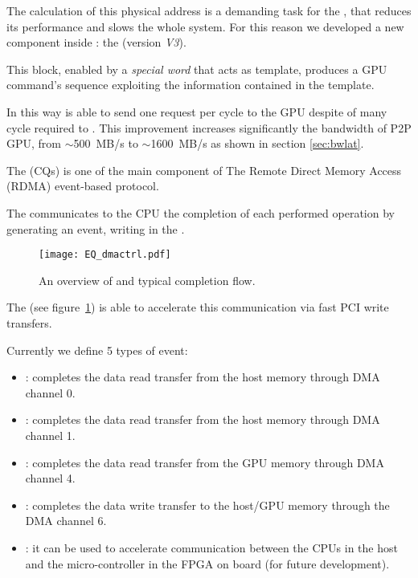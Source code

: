 The calculation of this physical address is a demanding task for the
\nios, that reduces its performance and slows the whole system. For
this reason we developed a new component inside : the  (\ptoptx version \textit{V3}).

This block, enabled by a \nios \emph{special word} that acts as
template, produces a GPU command's sequence exploiting the information
contained in the template.

In this way  is able to send one request per
cycle to the GPU despite of many cycle required to \nios. This
improvement increases significantly the bandwidth of P2P GPU, from
$\sim$500~MB/s to $\sim$1600~MB/s as shown in section \ref{sec:bwlat}.





\label{sec:eventq}
The \CQ (CQs) is one of the main component of The Remote Direct Memory
Access (RDMA) event-based protocol.


The \apenetp communicates to the CPU the completion of each performed
operation by generating an event, \ie writing in the \CQ.


\begin{figure}[!hbt]
  \centering \texttt{[image: EQ\_dmactrl.pdf]}
  \caption{An overview of  and typical
  completion flow.}
  \label{fig:EQ}
\end{figure}

The  (see figure~\ref{fig:EQ}) is able to
accelerate this communication via fast PCI write transfers.


Currently we define 5 types of event:

\begin{itemize}
\item \TXaevent:  completes the data read transfer from
the host memory through DMA channel 0.
\item \TXbevent:  completes the data read transfer from
the host memory through DMA channel 1.
\item \GPUTXevent:  completes the data read transfer
from the GPU memory through DMA channel 4.
\item \RXevent:  completes the data write transfer to the
host/GPU memory through the DMA channel 6.
\item \niosevent: it can be used to accelerate communication between
the CPUs in the host and the \mbox{micro-controller} in the FPGA on
board (for future development).
\end{itemize}


